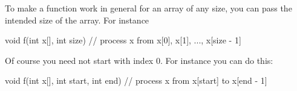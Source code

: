 To make a function work in general for an array of any size, you can pass the intended size of the array. For instance

\begin{consolethree}[escapeinside=||]
void f(int x[], int size)
{
    // process x from x[0], x[1], ..., x[size - 1]
}
\end{consolethree}

Of course you need not start with index 0. For instance you can do this:

\begin{consolethree}[escapeinside=||]       
void f(int x[], int start, int end)
{
    // process x from x[start] to x[end - 1]     
}
\end{consolethree}        
